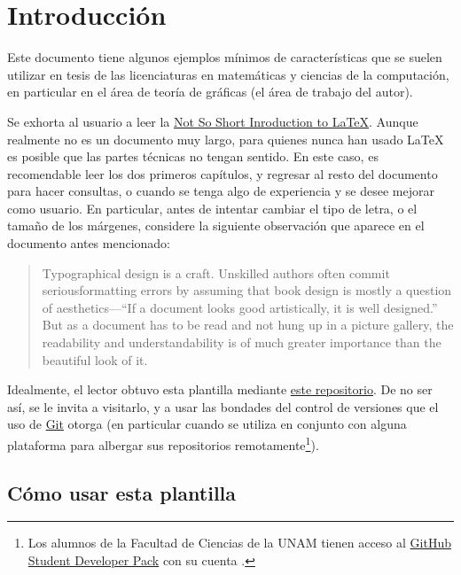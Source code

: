 \chapter{Introducci\'on}
\label{sec:intro}

Este documento tiene algunos ejemplos m\'inimos de caracter\'isticas que se
suelen utilizar en tesis de las licenciaturas en matem\'aticas y ciencias de la
computaci\'on, en particular en el \'area de teor\'ia de gr\'aficas (el \'area
de trabajo del autor).

Se exhorta al usuario a leer la
\href{https://tobi.oetiker.ch/lshort/lshort.pdf}{Not So Short Inroduction to
\LaTeX}.   Aunque realmente no es un documento muy largo, para quienes nunca han
usado \LaTeX{} es posible que las partes t\'ecnicas no tengan sentido.   En este
caso, es recomendable leer los dos primeros cap\'itulos, y regresar al resto del
documento para hacer consultas, o cuando se tenga algo de experiencia y se
desee mejorar como usuario.   En particular, antes de intentar cambiar el tipo
de letra, o el tama\~no de los m\'argenes, considere la siguiente observaci\'on
que aparece en el documento antes mencionado:
\begin{quote}
  Typographical design  is  a  craft.   Unskilled  authors  often  commit
  seriousformatting errors  by  assuming  that  book  design  is  mostly  a
  question of aesthetics---``If a document looks good artistically, it is well
  designed.'' But as a document has to be read and not hung up in a picture
  gallery, the readability and understandability is of much greater importance
  than the beautiful look of it.
\end{quote}

Idealmente, el lector obtuvo esta plantilla mediante
\href{https://github.com/Japodrilo/template-tesis}{este repositorio}. De no ser
as\'i, se le invita a visitarlo, y a usar las bondades del control de versiones
que el uso de \href{https://git-scm.com/}{Git} otorga (en particular cuando se
utiliza en conjunto con alguna plataforma para albergar sus repositorios
remotamente\footnote{Los alumnos de la Facultad de Ciencias de la UNAM tienen
acceso al \href{https://education.github.com/pack}{GitHub Student Developer
Pack} con su cuenta .}).


\section{C\'omo usar esta plantilla}
\label{sec:howto}

